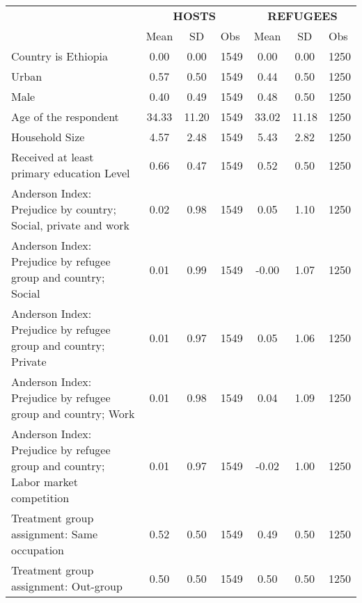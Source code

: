 {
\def\sym#1{\ifmmode^{#1}\else\(^{#1}\)\fi}
\begin{tabular}{l*{2}{ccc}}
\toprule
                    &\multicolumn{3}{c}{\textbf{HOSTS}}    &\multicolumn{3}{c}{\textbf{REFUGEES}} \\
                    &\multicolumn{1}{c}{{Mean}}&\multicolumn{1}{c}{{SD}}&\multicolumn{1}{l}{{Obs}}&\multicolumn{1}{c}{{Mean}}&\multicolumn{1}{c}{{SD}}&\multicolumn{1}{l}{{Obs}}\\
\midrule
Country is Ethiopia &        0.00&        0.00&        1549&        0.00&        0.00&        1250\\
\addlinespace
Urban               &        0.57&        0.50&        1549&        0.44&        0.50&        1250\\
\addlinespace
Male                &        0.40&        0.49&        1549&        0.48&        0.50&        1250\\
\addlinespace
Age of the respondent&       34.33&       11.20&        1549&       33.02&       11.18&        1250\\
\addlinespace
Household Size      &        4.57&        2.48&        1549&        5.43&        2.82&        1250\\
\addlinespace
Received at least primary education Level&        0.66&        0.47&        1549&        0.52&        0.50&        1250\\
\addlinespace
Anderson Index: Prejudice by country; Social, private and work&        0.02&        0.98&        1549&        0.05&        1.10&        1250\\
\addlinespace
Anderson Index: Prejudice by refugee group and country; Social &        0.01&        0.99&        1549&       -0.00&        1.07&        1250\\
\addlinespace
Anderson Index: Prejudice by refugee group and country; Private&        0.01&        0.97&        1549&        0.05&        1.06&        1250\\
\addlinespace
Anderson Index: Prejudice by refugee group and country; Work&        0.01&        0.98&        1549&        0.04&        1.09&        1250\\
\addlinespace
Anderson Index: Prejudice by refugee group and country; Labor market competition&        0.01&        0.97&        1549&       -0.02&        1.00&        1250\\
\addlinespace
Treatment group assignment: Same occupation&        0.52&        0.50&        1549&        0.49&        0.50&        1250\\
\addlinespace
Treatment group assignment: Out-group&        0.50&        0.50&        1549&        0.50&        0.50&        1250\\
\bottomrule
\end{tabular}
}
